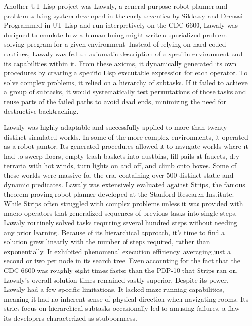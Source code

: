 Another UT-Lisp project was Lawaly, a general-purpose robot planner and problem-solving system developed in the early seventies by Siklossy and Dreussi. Programmed in UT-Lisp and run interpretively on the CDC 6600, Lawaly was designed to emulate how a human being might write a specialized problem-solving program for a given environment. Instead of relying on hard-coded routines, Lawaly was fed an axiomatic description of a specific environment and its capabilities within it. From these axioms, it dynamically generated its own procedures by creating a specific Lisp executable expression for each operator. To solve complex problems, it relied on a hierarchy of subtasks. If it failed to achieve a group of subtasks, it would systematically test permutations of those tasks and reuse parts of the failed paths to avoid dead ends, minimizing the need for destructive backtracking.

Lawaly was highly adaptable and successfully applied to more than twenty distinct simulated worlds. In some of the more complex environments, it operated as a robot-janitor. Its generated procedures allowed it to navigate worlds where it had to sweep floors, empty trash baskets into dustbins, fill pails at faucets, dry terraria with hot winds, turn lights on and off, and climb onto boxes. Some of these worlds were massive for the era, containing over 500 distinct static and dynamic predicates. Lawaly was extensively evaluated against Strips, the famous theorem-proving robot planner developed at the Stanford Research Institute. While Strips often struggled with complex problems unless it was provided with macro-operators that generalized sequences of previous tasks into single steps, Lawaly routinely solved tasks requiring several hundred steps without needing any prior learning. Because of its hierarchical approach, it's time to find a solution grew linearly with the number of steps required, rather than exponentially. It exhibited phenomenal execution efficiency, averaging just a second or two per node in its search tree. Even accounting for the fact that the CDC 6600 was roughly eight times faster than the PDP-10 that Strips ran on, Lawaly’s overall solution times remained vastly superior. Despite its power, Lawaly had a few specific limitations. It lacked maze-running capabilities, meaning it had no inherent sense of physical direction when navigating rooms. Its strict focus on hierarchical subtasks occasionally led to amusing failures, a flaw its developers characterized as stubbornness.

